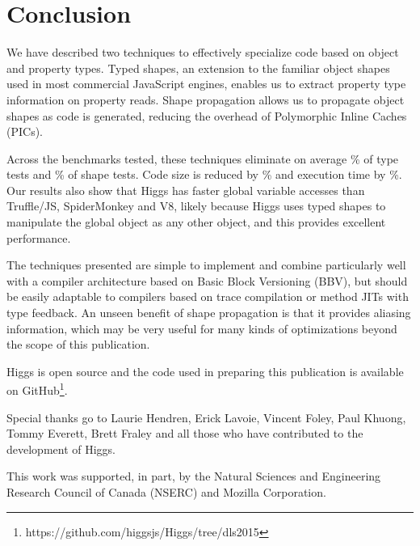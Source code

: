 \documentclass[preprint]{sigplanconf}
\newcommand{\stat}[1]{\unskip}
\newcommand{\percentstat}[1]{\unskip\%}
\begin{document}
 
\section{Conclusion}\label{sec:conclusion}
We have described two techniques to effectively specialize code based on object
and property types. Typed shapes, an extension to the familiar object shapes
used in most commercial JavaScript engines, enables us to extract property
type information on property reads. Shape propagation allows us to propagate
object shapes as code is generated, reducing the overhead of Polymorphic
Inline Caches (PICs).

Across the \stat{num_benchs} benchmarks tested, these techniques eliminate on
average \percentstat{testcounts_decr_maxshapes2} of type tests and
\percentstat{shapetests_decr_maxshapes2} of shape tests. Code size is reduced
by \percentstat{codesize_decr_maxshapes2} and execution time by
\percentstat{exectime_decr_maxshapes2}. Our results also show that Higgs
has faster global variable accesses than Truffle/JS, SpiderMonkey and V8,
likely because Higgs uses typed shapes to manipulate the global object as any
other object, and this provides excellent performance.

The techniques presented are simple to implement and combine particularly well
with a compiler architecture based on Basic Block Versioning (BBV), but
should be easily adaptable to compilers based on trace compilation or
method JITs with type feedback. An unseen benefit of shape propagation is that
it provides aliasing information, which may be very useful for many kinds of
optimizations beyond the scope of this publication.

Higgs is open source and the code used in preparing this publication is
available on GitHub\footnote{https://github.com/higgsjs/Higgs/tree/dls2015}.

 
\acks


Special thanks go to Laurie Hendren, Erick Lavoie, Vincent Foley, Paul Khuong,
Tommy Everett, Brett Fraley and all those who have contributed to the
development of Higgs.

This work was supported, in part, by the Natural Sciences and Engineering
Research Council of Canada (NSERC) and Mozilla Corporation.



\end{document}
